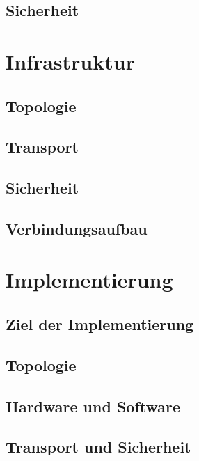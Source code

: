 \documentclass[doktyp=barbeit]{TUBAFarbeiten}
\begin{document}
	\subsection{Sicherheit}

\newpage
\section{Infrastruktur}
	

	\subsection{Topologie}
		

	\subsection{Transport}
		

	\subsection{Sicherheit}

	\subsection{Verbindungsaufbau}

\newpage
\section{Implementierung}

	\subsection{Ziel der Implementierung}

	\subsection{Topologie}

	\subsection{Hardware und Software}

	\subsection{Transport und Sicherheit}
\end{document}
